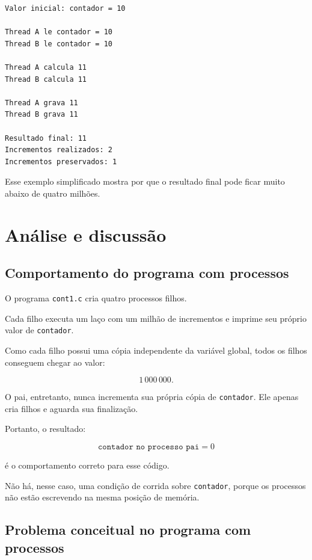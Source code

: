 \begin{verbatim}
Valor inicial: contador = 10

Thread A le contador = 10
Thread B le contador = 10

Thread A calcula 11
Thread B calcula 11

Thread A grava 11
Thread B grava 11

Resultado final: 11
Incrementos realizados: 2
Incrementos preservados: 1
\end{verbatim}

Esse exemplo simplificado mostra por que o resultado final pode ficar muito abaixo de quatro milhões.

\section{Análise e discussão}
\label{sec:atvd03-discussao}

\subsection{Comportamento do programa com processos}

O programa \texttt{cont1.c} cria quatro processos filhos.

Cada filho executa um laço com um milhão de incrementos e imprime seu próprio valor de \texttt{contador}.

Como cada filho possui uma cópia independente da variável global, todos os filhos conseguem chegar ao valor:

\begin{equation}
    1\,000\,000.
\end{equation}

O pai, entretanto, nunca incrementa sua própria cópia de \texttt{contador}. Ele apenas cria filhos e aguarda sua finalização.

Portanto, o resultado:

\begin{equation}
    \texttt{contador no processo pai} = 0
\end{equation}

é o comportamento correto para esse código.

Não há, nesse caso, uma condição de corrida sobre \texttt{contador}, porque os processos não estão escrevendo na mesma posição de memória.

\subsection{Problema conceitual no programa com processos}

